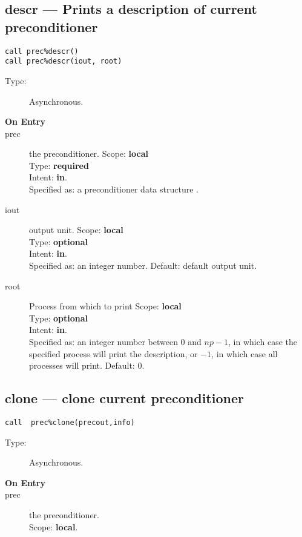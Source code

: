 \clearpage\subsection{descr --- Prints a description of current
  preconditioner}

\begin{verbatim}
call prec%descr()
call prec%descr(iout, root)
\end{verbatim}

\begin{description}
\item[Type:] Asynchronous.
\item[\bf On Entry]
\item[prec] the preconditioner.
Scope: {\bf local} \\
Type: {\bf required}\\
Intent: {\bf in}.\\
Specified as: a preconditioner data structure \precdata.
\item[iout] output unit.
Scope: {\bf local} \\
Type: {\bf optional}\\
Intent: {\bf in}.\\
Specified as: an integer number. Default: default output unit.
\item[root] Process from which to print
Scope: {\bf local} \\
Type: {\bf optional}\\
Intent: {\bf in}.\\
Specified as: an integer number between 0 and $np-1$, in which case
the specified process will print the description, or $-1$, in which case
all processes will print. Default: 0. 
\end{description}



\clearpage\subsection{clone --- clone  current
  preconditioner}
\begin{verbatim}
call  prec%clone(precout,info)
\end{verbatim}

\begin{description}
\item[Type:] Asynchronous.
\item[\bf On Entry]
\item[prec] the preconditioner.\\
Scope: {\bf local}.\\
\end{description}

